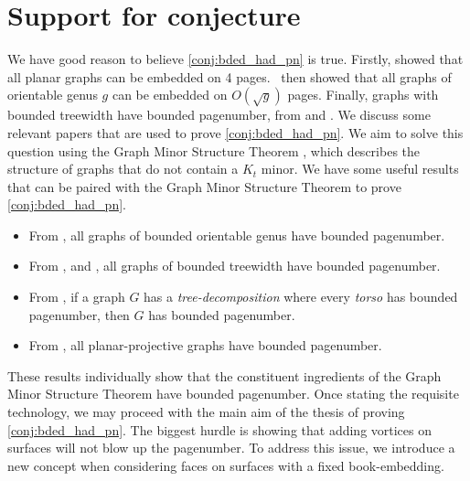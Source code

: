 \section{Support for conjecture}
We have good reason to believe \cref{conj:bded_had_pn} is true. Firstly, \textcite{yannakakisEmbeddingPlanarGraphs1989} showed that all planar graphs can be embedded on 4 pages.\ \textcite{malitzGenusGraphsHave1994} then showed that all graphs of orientable genus $g$ can be embedded on $O(\sqrt{g})$ pages. Finally, graphs with bounded treewidth have bounded pagenumber, from \textcite{ganleyPagenumberTrees2001} and \textcite{dujmovicGraphTreewidthGeometric2007}.
We discuss some relevant papers that are used to prove \cref{conj:bded_had_pn}.
We aim to solve this question using the Graph Minor Structure Theorem \cite{robertsonGraphMinorsXVI2003}, which describes the structure of graphs that do not contain a \(K_t\) minor. 
We have some useful results that can be paired with the Graph Minor Structure Theorem to prove \cref{conj:bded_had_pn}.
\begin{itemize}
	\item From \textcite{heathPagenumberGenusGraphs1992}, all graphs of bounded orientable genus have bounded pagenumber.
	\item From \textcite{ganleyPagenumberTrees2001}, and \textcite{dujmovicGraphTreewidthGeometric2007}, all graphs of bounded treewidth have bounded pagenumber.
	\item From \textcite{hickingbothamStackNumberCliqueSum2023}, if a graph \(G\) has a \textit{tree-decomposition} where every \textit{torso} has bounded pagenumber, then \(G\) has bounded pagenumber.
	\item From \textcite{nakamotoBookEmbeddingProjectiveplanar2015}, all planar-projective graphs have bounded pagenumber.
\end{itemize}
These results individually show that the constituent ingredients of the Graph Minor Structure Theorem have bounded pagenumber. Once stating the requisite technology, we may proceed with the main aim of the thesis of proving \cref{conj:bded_had_pn}. 
The biggest hurdle is showing that adding vortices on surfaces will not blow up the pagenumber. To address this issue, we introduce a new concept when considering faces on surfaces with a fixed book-embedding. 